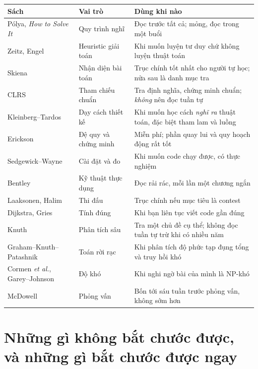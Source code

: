 \documentclass[../../algorithm.tex]{subfiles}
\begin{document}
\begin{center}\footnotesize
\begin{tabularx}{\linewidth}{@{}L{4.6cm}L{2.6cm}Y@{}}
\toprule
\textbf{Sách} & \textbf{Vai trò} & \textbf{Dùng khi nào}\\
\midrule
Pólya, \emph{How to Solve It}\cite{polya1945} & Quy trình nghĩ & Đọc trước tất cả; mỏng, đọc trong một buổi\\
Zeitz\cite{zeitz2007}, Engel\cite{engel1998} & Heuristic giải toán & Khi muốn luyện tư duy chứ không luyện thuật toán\\
Skiena\cite{skiena2020} & Nhận diện bài toán & Trục chính tốt nhất cho người tự học; nửa sau là danh mục tra\\
CLRS\cite{clrs2022} & Tham chiếu chuẩn & Tra định nghĩa, chứng minh chuẩn; \emph{không} nên đọc tuần tự\\
Kleinberg--Tardos\cite{kleinberg2006} & Dạy cách thiết kế & Khi muốn học cách \emph{nghĩ ra} thuật toán, đặc biệt tham lam và luồng\\
Erickson\cite{erickson2019} & Đệ quy và chứng minh & Miễn phí; phần quay lui và quy hoạch động rất tốt\\
Sedgewick--Wayne\cite{sedgewick2011} & Cài đặt và đo & Khi muốn code chạy được, có thực nghiệm\\
Bentley\cite{bentley2000} & Kỹ thuật thực dụng & Đọc rải rác, mỗi lần một chương ngắn\\
Laaksonen\cite{laaksonen2017}, Halim\cite{halim2020} & Thi đấu & Trục chính nếu mục tiêu là contest\\
Dijkstra\cite{dijkstra1976}, Gries\cite{gries1981} & Tính đúng & Khi bạn liên tục viết code gần đúng\\
Knuth\cite{knuth1997v1} & Phân tích sâu & Tra một chủ đề cụ thể; không đọc tuần tự trừ khi có nhiều năm\\
Graham--Knuth--Patashnik\cite{graham1994} & Toán rời rạc & Khi phân tích độ phức tạp đụng tổng và truy hồi khó\\
Cormen \emph{et al.}, Garey--Johnson\cite{garey1979} & Độ khó & Khi nghi ngờ bài của mình là NP-khó\\
McDowell\cite{mcdowell2015} & Phỏng vấn & Bốn tới sáu tuần trước phỏng vấn, không sớm hơn\\
\bottomrule
\end{tabularx}
\end{center}

\section{Những gì không bắt chước được, và những gì bắt chước được ngay}
\end{document}
